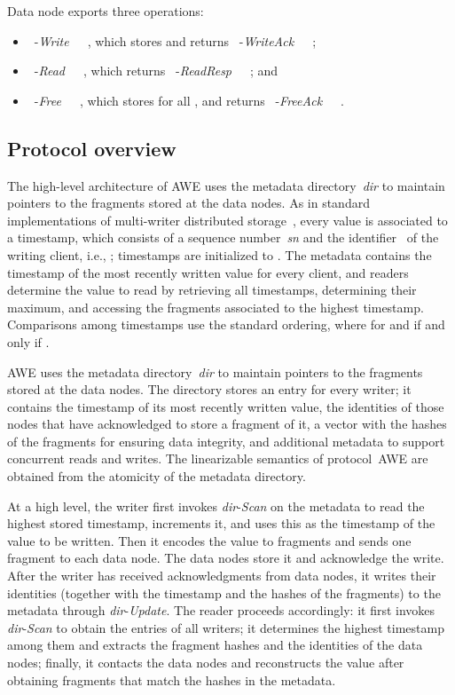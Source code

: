 \documentclass[oribibl]{llncs}
\theoremstyle{definition-boldhead}
\newcommand{\var}[1]{\textit{#1}}
\newcommand{\op}[1]{\textsl{#1}}
\newcommand{\eventt}[3]{~{\var{#1}}-\textsl{#2}~~{#3}~}
\newcommand{\dir}{\var{dir}\xspace}
\newcommand{\NAME}{AWE\xspace}
\newcommand{\node}{node\xspace}
\newcommand{\nodes}{nodes\xspace}
\begin{document}
Data \node  exports three operations:
\begin{itemize}
\item \eventt{}{Write}{}, which stores  and returns \eventt{}{WriteAck}{};
\item  \eventt{}{Read}{}, which returns  \eventt{}{ReadResp}{}; and
\item  \eventt{}{Free}{}, which stores  for all , and returns \eventt{}{FreeAck}{}.
\end{itemize}

\fi

\subsection{Protocol overview}

\if\submit\no
The high-level architecture of \NAME uses the metadata directory~\dir
to maintain pointers to the fragments stored at the data \nodes.
As in standard implementations of multi-writer distributed
storage~\cite{CachinGR11}, every value is associated to a timestamp,
which consists of a sequence number~\var{sn} and the identifier~ of
the writing client, i.e., ; timestamps
are initialized to .  The metadata contains the
timestamp of the most recently written value for every client, and
readers determine the value to read by retrieving all timestamps,
determining their maximum, and accessing the fragments associated to
the highest timestamp.  Comparisons among timestamps use the standard
ordering, where  for  and  if and only if
.
\fi

\if\submit\yes
\NAME uses the metadata directory~\dir
to maintain pointers to the fragments stored at the data \nodes.
\fi
The directory stores an entry for every writer; it contains the
timestamp of its most recently written value, the identities of those
\nodes that have acknowledged to store a fragment of it, a vector
with the hashes of the fragments for ensuring data integrity, and
additional metadata to support concurrent reads and writes.  The linearizable
semantics of protocol~\NAME are obtained from the atomicity of the
metadata directory.

At a high level, the writer first invokes \dir-\op{Scan} on the
metadata to read the highest stored timestamp, increments it, and uses
this as the timestamp of the value to be written.  Then it encodes the
value to  fragments and sends one fragment to each data \node.
The data \nodes store it and acknowledge the write.  After the
writer has received acknowledgments from  data \nodes, it
writes their identities (together with the timestamp and the hashes of
the fragments) to the metadata through \dir-\op{Update}.  The reader
proceeds accordingly: it first invokes \dir-\op{Scan} to obtain the
entries of all writers; it determines the highest timestamp among them
and extracts the fragment hashes and the identities of the data
\nodes; finally, it contacts the data \nodes and reconstructs the
value after obtaining  fragments that match the hashes in the
metadata.
\end{document}
